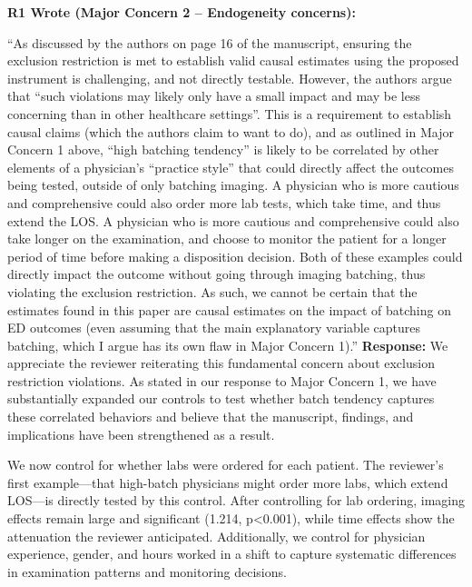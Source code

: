 \documentclass[11pt]{article}
\newenvironment{quote2}
{ \bigskip
\noindent
         \small\em
         \baselineskip=14pt
}
\newcommand{\1}{\hbox{\rm 1\kern-.35em 1}}
\begin{document}
\begin{quote2}
\textbf{R1 Wrote (Major Concern 2 – Endogeneity concerns):}  

\noindent ``As discussed by the authors on page 16 of the manuscript, ensuring the exclusion restriction is met to establish valid causal estimates using the proposed instrument is challenging, and not directly testable. However, the authors argue that “such violations may likely only have a small impact and may be less concerning than in other healthcare settings”. This is a requirement to establish causal claims (which the authors claim to want to do), and as outlined in Major Concern 1 above, “high batching tendency” is likely to be correlated by other elements of a physician’s “practice style” that could directly affect the outcomes being tested, outside of only batching imaging. A physician who is more cautious and comprehensive could also order more lab tests, which take time, and thus extend the LOS. A physician who is more cautious and comprehensive could also take longer on the examination, and choose to monitor the patient for a longer period of time before making a disposition decision. Both of these examples could directly impact the outcome without going through imaging batching, thus violating the exclusion restriction. As such, we cannot be certain that the estimates found in this paper are causal estimates on the impact of batching on ED outcomes (even assuming that the main explanatory variable captures batching, which I argue has its own flaw in Major Concern 1).” 
\end{quote2}


\noindent\textbf{Response:} \color{blue}We appreciate the reviewer reiterating this fundamental concern about exclusion restriction violations. As stated in our response to Major Concern 1, we have substantially expanded our controls to test whether batch tendency captures these correlated behaviors and believe that the manuscript, findings, and implications have been strengthened as a result.

We now control for whether labs were ordered for each patient. The reviewer's first example—that high-batch physicians might order more labs, which extend LOS—is directly tested by this control. After controlling for lab ordering, imaging effects remain large and significant (1.214, p<0.001), while time effects show the attenuation the reviewer anticipated. Additionally, we control for physician experience, gender, and hours worked in a shift to capture systematic differences in examination patterns and monitoring decisions.
\end{document}
